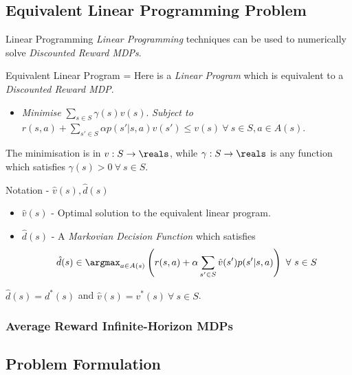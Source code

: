 \documentclass[11pt,a4paper]{article}
\begin{document}
\subsection*{Equivalent Linear Programming Problem}

  \begin{proposition}{Linear Programming}
    \textit{Linear Programming} techniques can be used to numerically solve \textit{Discounted Reward MDPs}.
  \end{proposition}

  \begin{proposition}{Equivalent Linear Program}
    \everymath={\displaystyle}
    Here is a \textit{Linear Program} which is equivalent to a \textit{Discounted Reward MDP}.
    \begin{itemize}
      \item \textit{Minimise} $\sum_{s\in S}\gamma(s)v(s)$.
      \itme \textit{Subject to} $r(s,a)+\sum_{s'\in S}\alpha p(s'|s,a)v(s')\leq v(s)\ \forall\ s\in S,a\in A(s)$.
    \end{itemize}
    The minimisation is in $v:S\to\reals$, while $\gamma:S\to\reals$ is any function which satisfies $\gamma(s)>0\ \forall\ s\in S$.
  \end{proposition}

  \begin{proposition}{Notation - $\hat{v}(s),\hat{d}(s)$}
    \begin{itemize}
      \item $\hat{v}(s)$ - Optimal solution to the equivalent linear program.
      \item $\hat{d}(s)$ - A \textit{Markovian Decision Function} which satisfies
      \[ \hat{d}(s)\in\argmax_{a\in A(s)}\left(r(s,a)+\alpha\sum_{s'\in S}\hat{v}(s')p(s'|s,a)\right)\ \forall\ s\in S \]
    \end{itemize}
  \end{proposition}

  \begin{theorem}{}
    $\hat{d}(s)=d^*(s)$ and $\hat{v}(s)=v^*(s)\ \forall\ s\in S$.
  \end{theorem}

\subsubsection{Average Reward Infinite-Horizon MDPs}

\subsection*{Problem Formulation}
\end{document}
